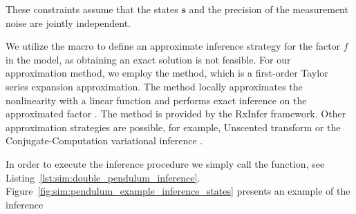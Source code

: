 These constraints assume that the states $\bm{s}$ and the precision of the measurement noise
are jointly independent.
\begin{figure*}
  \begin{adjustbox}{minipage=\textwidth,margin=0pt \smallskipamount,center}
  \end{adjustbox}
\end{figure*}
We utilize the  macro to define an approximate inference strategy for the factor
$f$ in the model, as obtaining an exact solution is not feasible.
For our approximation method, we employ the  method, which is a
first-order Taylor series expansion approximation.
The method locally approximates the nonlinearity with a linear function and performs exact
inference on the approximated factor \citep[Section~5.2]{sarkka_bayesian_2013}.
The  method is provided by the RxInfer framework.
Other approximation strategies are possible, for example, Unscented transform
\citep[Section~5.5]{sarkka_bayesian_2013} or the Conjugate-Computation variational inference 
\citep{khan_conjugate-computation_2017,akbayrak_probabilistic_2022}.
\begin{figure*}
  \begin{adjustbox}{minipage=\textwidth,margin=0pt \smallskipamount,center}
  \end{adjustbox}
\end{figure*}
In order to execute the inference procedure we simply call the  function,
see Listing~\eqref{lst:sim:double_pendulum_inference}.
Figure~\ref{fig:sim:pendulum_example_inference_states} presents an example of the inference
